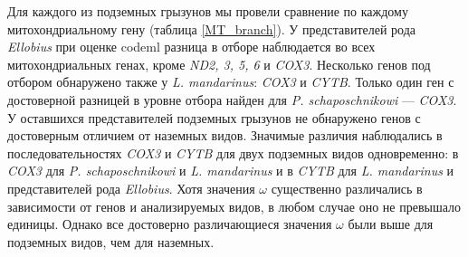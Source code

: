 Для каждого из подземных грызунов мы провели сравнение по каждому митохондриальному гену (таблица \ref{MT_branch}). У представителей рода \textit{Ellobius} при оценке  codeml разница в отборе наблюдается во всех митохондриальных генах, кроме \textit{ND2, 3, 5, 6} и \textit{COX3}. Несколько генов под отбором обнаружено также у \textit{L. mandarinus}: \textit{COX3} и \textit{CYTB}. Только один ген с достоверной разницей в уровне отбора найден для \textit{P. schaposchnikowi} --- \textit{COX3}. У оставшихся представителей подземных грызунов не обнаружено генов с достоверным отличием от наземных видов. Значимые различия наблюдались в последовательностях \textit{COX3} и \textit{CYTB} для двух подземных видов одновременно: в \textit{COX3} для \textit{P. schaposchnikowi} и \textit{L. mandarinus} и в \textit{CYTB} для \textit{L. mandarinus} и представителей рода \textit{Ellobius}. 
Хотя значения $\omega$ существенно различались в зависимости от генов и анализируемых видов, в любом случае оно не превышало единицы. Однако все достоверно различающиеся значения $\omega$ были выше для подземных видов, чем для наземных. 

